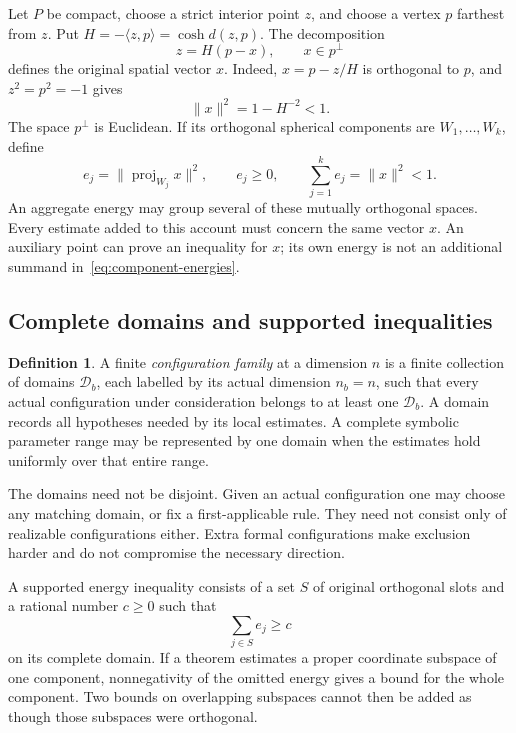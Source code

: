 \documentclass[11pt]{article}
\theoremstyle{definition}
\newtheorem{definition}[theorem]{Definition}
\theoremstyle{remark}
\numberwithin{equation}{section}
\newcommand{\ip}[2]{\langle #1,#2\rangle}
\newcommand{\norm}[1]{\lVert #1\rVert}
\begin{document}
Let $P$ be compact, choose a strict interior point $z$, and choose a
vertex $p$ farthest from $z$. Put $H=-\ip{z}{p}=\cosh d(z,p)$.
The decomposition
\begin{equation}\label{eq:original-vector}
                   z=H(p-x),\qquad x\in p^\perp
\end{equation}
defines the original spatial vector $x$. Indeed,
$x=p-z/H$ is orthogonal to $p$, and $z^2=p^2=-1$ gives
\begin{equation}\label{eq:original-budget}
                         \norm{x}^2=1-H^{-2}<1.
\end{equation}
The space $p^\perp$ is Euclidean. If its orthogonal spherical
components are $W_1,\ldots,W_k$, define
\begin{equation}\label{eq:component-energies}
 e_j=\norm{\operatorname{proj}_{W_j}x}^2,\qquad
 e_j\ge0,\qquad \sum_{j=1}^ke_j=\norm{x}^2<1.
\end{equation}
An aggregate energy may group several of these mutually orthogonal
spaces. Every estimate added to this account must concern the same
vector $x$. An auxiliary point can prove an inequality for $x$;
its own energy is not an additional summand in~\eqref{eq:component-energies}.

\subsection{Complete domains and supported inequalities}

\begin{definition}\label{def:configuration-family}
A finite \emph{configuration family} at a dimension $n$ is a finite
collection of domains $\mathcal D_b$, each labelled by its actual
dimension $n_b=n$, such that every actual configuration under
consideration belongs to at least one $\mathcal D_b$. A domain records
all hypotheses needed by its local estimates. A complete symbolic
parameter range may be represented by one domain when the estimates
hold uniformly over that entire range.
\end{definition}

The domains need not be disjoint. Given an actual configuration one
may choose any matching domain, or fix a first-applicable rule. They
need not consist only of realizable configurations either. Extra
formal configurations make exclusion harder and do not compromise
the necessary direction.

A supported energy inequality consists of a set $S$ of original
orthogonal slots and a rational number $c\ge0$ such that
\begin{equation}\label{eq:supported-row}
                            \sum_{j\in S}e_j\ge c
\end{equation}
on its complete domain. If a theorem estimates a proper coordinate
subspace of one component, nonnegativity of the omitted energy gives
a bound for the whole component. Two bounds on overlapping subspaces
cannot then be added as though those subspaces were orthogonal.
\end{document}
